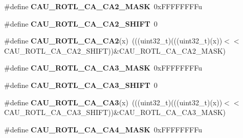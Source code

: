 \begin{DoxyCompactItemize}
\item 
\#define {\bfseries C\+A\+U\+\_\+\+R\+O\+T\+L\+\_\+\+C\+A\+\_\+\+C\+A2\+\_\+\+M\+A\+SK}~0x\+F\+F\+F\+F\+F\+F\+F\+Fu\hypertarget{group__CAU__Register__Masks_ga747bae472035b772b9099ece284b7520}{}\label{group__CAU__Register__Masks_ga747bae472035b772b9099ece284b7520}

\item 
\#define {\bfseries C\+A\+U\+\_\+\+R\+O\+T\+L\+\_\+\+C\+A\+\_\+\+C\+A2\+\_\+\+S\+H\+I\+FT}~0\hypertarget{group__CAU__Register__Masks_ga8b25b4c825c9173a0abd5efdd58a82e4}{}\label{group__CAU__Register__Masks_ga8b25b4c825c9173a0abd5efdd58a82e4}

\item 
\#define {\bfseries C\+A\+U\+\_\+\+R\+O\+T\+L\+\_\+\+C\+A\+\_\+\+C\+A2}(x)~(((uint32\+\_\+t)(((uint32\+\_\+t)(x))$<$$<$C\+A\+U\+\_\+\+R\+O\+T\+L\+\_\+\+C\+A\+\_\+\+C\+A2\+\_\+\+S\+H\+I\+FT))\&C\+A\+U\+\_\+\+R\+O\+T\+L\+\_\+\+C\+A\+\_\+\+C\+A2\+\_\+\+M\+A\+SK)\hypertarget{group__CAU__Register__Masks_ga75488166e5d5cb963886e5df06554dcb}{}\label{group__CAU__Register__Masks_ga75488166e5d5cb963886e5df06554dcb}

\item 
\#define {\bfseries C\+A\+U\+\_\+\+R\+O\+T\+L\+\_\+\+C\+A\+\_\+\+C\+A3\+\_\+\+M\+A\+SK}~0x\+F\+F\+F\+F\+F\+F\+F\+Fu\hypertarget{group__CAU__Register__Masks_gac3bb01fa4c02a43a9367a61519d287f2}{}\label{group__CAU__Register__Masks_gac3bb01fa4c02a43a9367a61519d287f2}

\item 
\#define {\bfseries C\+A\+U\+\_\+\+R\+O\+T\+L\+\_\+\+C\+A\+\_\+\+C\+A3\+\_\+\+S\+H\+I\+FT}~0\hypertarget{group__CAU__Register__Masks_gaefb05fe2e03750f3f2123bb5014e8d80}{}\label{group__CAU__Register__Masks_gaefb05fe2e03750f3f2123bb5014e8d80}

\item 
\#define {\bfseries C\+A\+U\+\_\+\+R\+O\+T\+L\+\_\+\+C\+A\+\_\+\+C\+A3}(x)~(((uint32\+\_\+t)(((uint32\+\_\+t)(x))$<$$<$C\+A\+U\+\_\+\+R\+O\+T\+L\+\_\+\+C\+A\+\_\+\+C\+A3\+\_\+\+S\+H\+I\+FT))\&C\+A\+U\+\_\+\+R\+O\+T\+L\+\_\+\+C\+A\+\_\+\+C\+A3\+\_\+\+M\+A\+SK)\hypertarget{group__CAU__Register__Masks_gafdde8a37c0517f2bc5637da808ef9252}{}\label{group__CAU__Register__Masks_gafdde8a37c0517f2bc5637da808ef9252}

\item 
\#define {\bfseries C\+A\+U\+\_\+\+R\+O\+T\+L\+\_\+\+C\+A\+\_\+\+C\+A4\+\_\+\+M\+A\+SK}~0x\+F\+F\+F\+F\+F\+F\+F\+Fu\hypertarget{group__CAU__Register__Masks_gadbb02082ccfd702cac02e0201c2810ae}{}\label{group__CAU__Register__Masks_gadbb02082ccfd702cac02e0201c2810ae}


\end{DoxyCompactItemize}
